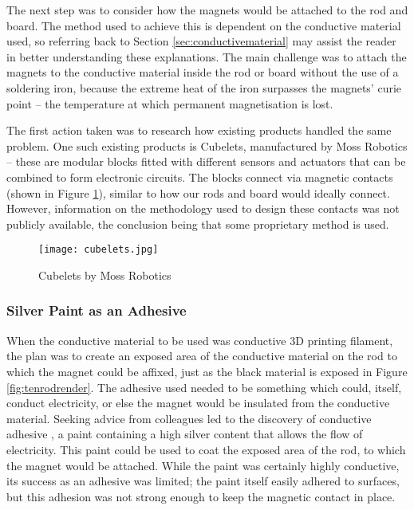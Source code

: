 The next step was to consider how the magnets would be attached to the rod and board. The method used to achieve this is dependent on the conductive material used, so referring back to Section \ref{sec:conductivematerial} may assist the reader in better understanding these explanations. The main challenge was to attach the magnets to the conductive material inside the rod or board without the use of a soldering iron, because the extreme heat of the iron surpasses the magnets' curie point -- the temperature at which permanent magnetisation is lost.  

The first action taken was to research how existing products handled the same problem. One such existing products is Cubelets, manufactured by Moss Robotics -- these are modular blocks fitted with different sensors and actuators that can be combined to form electronic circuits. The blocks connect via magnetic contacts (shown in Figure \ref{fig:cubelets}), similar to how our rods and board would ideally connect. However, information on the methodology used to design these contacts was not publicly available, the conclusion being that some proprietary method is used. 

\begin{figure}[H]
	\begin{center}
	\texttt{[image: cubelets.jpg]}\\ 
  	\caption{Cubelets by Moss Robotics \cite{Cubelets52:online}}
    \label{fig:cubelets}
    \end{center}
\end{figure}

\subsubsection{Silver Paint as an Adhesive}

When the conductive material to be used was conductive 3D printing filament, the plan was to create an exposed area of the conductive material on the rod to which the magnet could be affixed, just as the black material is exposed in Figure \ref{fig:tenrodrender}. The adhesive used needed to be something which could, itself, conduct electricity, or else the magnet would be insulated from the conductive material. Seeking advice from colleagues led to the discovery of conductive adhesive \cite{ERSCP03B89:online}, a paint containing a high silver content that allows the flow of electricity. This paint could be used to coat the exposed area of the rod, to which the magnet would be attached. While the paint was certainly highly conductive, its success as an adhesive was limited; the paint itself easily adhered to surfaces, but this adhesion was not strong enough to keep the magnetic contact in place. \\

